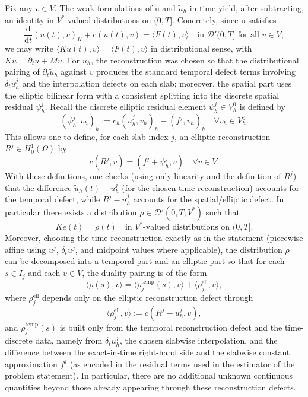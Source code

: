 \documentclass{article}
\begin{document}
Fix any \(v\in V\). The weak formulations of u and \(\tilde u_h\) in time yield, after subtracting, an identity in \(V^*\)-valued distributions on \((0,T]\). Concretely, since u satisfies
\[
\frac{\mathrm d}{\mathrm dt}(u(t),v)_H + c(u(t),v)=\langle F(t),v\rangle\quad\text{in }\mathcal D'(0,T]\text{ for all }v\in V,
\]
we may write \(\langle Ku(t),v\rangle= \langle F(t),v\rangle\) in distributional sense, with \(Ku=\partial_t u+Mu\). For \(\tilde u_h\), the reconstruction was chosen so that the distributional pairing of \(\partial_t\tilde u_h\) against \(v\) produces the standard temporal defect terms involving \(\delta_t u_h^j\) and the interpolation defects on each slab; moreover, the spatial part uses the elliptic bilinear form with a consistent splitting into the discrete spatial residual \(\psi_h^j\). Recall the discrete elliptic residual element \(\psi_h^j\in V_h^0\) is defined by
\[
(\psi_h^j,v_h)_h:=c_h(u_h^j,v_h)_h-(f^j,v_h)_h\quad\forall v_h\in V_h^0.
\]
This allows one to define, for each slab index \(j\), an elliptic reconstruction \(R^j\in H_0^1(\Omega)\) by
\[
c(R^j,v)= (f^j+\psi_h^j,v)\quad\forall v\in V.
\]
With these definitions, one checks (using only linearity and the definition of \(R^j\)) that the difference \(\tilde u_h(t)-u_h^j\) (for the chosen time reconstruction) accounts for the temporal defect, while \(R^j-u_h^j\) accounts for the spatial/elliptic defect. In particular there exists a distribution \(\rho\in \mathcal D'(0,T;V^*)\) such that
\[
Ke(t)=\rho(t)\quad\text{in }V^*\text{-valued distributions on }(0,T].
\]
Moreover, choosing the time reconstruction exactly as in the statement (piecewise affine using \(u^j\), \(\delta_t u^j\), and midpoint values where applicable), the distribution \(\rho\) can be decomposed into a temporal part and an elliptic part so that for each \(s\in I_j\) and each \(v\in V\), the duality pairing is of the form
\[
\langle \rho(s),v\rangle = \langle \rho_j^{\mathrm{temp}}(s),v\rangle + \langle \rho_j^{\mathrm{ell}},v\rangle,
\]
where \(\rho_j^{\mathrm{ell}}\) depends only on the elliptic reconstruction defect through
\[
\langle \rho_j^{\mathrm{ell}},v\rangle := c(R^j-u_h^j,v),
\]
and \(\rho_j^{\mathrm{temp}}(s)\) is built only from the temporal reconstruction defect and the time-discrete data, namely from \(\delta_t u_h^j\), the chosen slabwise interpolation, and the difference between the exact-in-time right-hand side and the slabwise constant approximation \(f^j\) (as encoded in the residual terms used in the estimator of the problem statement). In particular, there are no additional unknown continuous quantities beyond those already appearing through these reconstruction defects.
\end{document}
